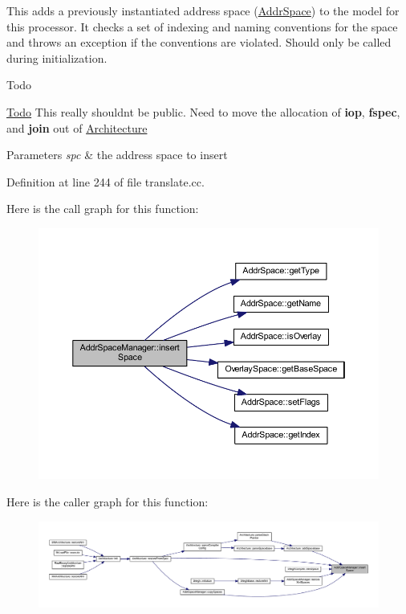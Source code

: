 This adds a previously instantiated address space (\mbox{\hyperlink{class_addr_space}{Addr\+Space}}) to the model for this processor. It checks a set of indexing and naming conventions for the space and throws an exception if the conventions are violated. Should only be called during initialization. \begin{DoxyRefDesc}{Todo}
\item[\mbox{\hyperlink{todo__todo000002}{Todo}}]This really shouldn\textquotesingle{}t be public. Need to move the allocation of {\bfseries{iop}}, {\bfseries{fspec}}, and {\bfseries{join}} out of \mbox{\hyperlink{class_architecture}{Architecture}} \end{DoxyRefDesc}

\begin{DoxyParams}{Parameters}
{\em spc} & the address space to insert \\
\hline
\end{DoxyParams}


Definition at line 244 of file translate.\+cc.

Here is the call graph for this function\+:
\nopagebreak
\begin{figure}[H]
\begin{center}
\leavevmode
\includegraphics[width=350pt]{class_addr_space_manager_a89658bd677414a271a918f0f37af0bd6_cgraph}
\end{center}
\end{figure}
Here is the caller graph for this function\+:
\nopagebreak
\begin{figure}[H]
\begin{center}
\leavevmode
\includegraphics[width=350pt]{class_addr_space_manager_a89658bd677414a271a918f0f37af0bd6_icgraph}
\end{center}
\end{figure}
\mbox{\label{class_addr_space_manager_ae2d22102a7ce6080918e82daafabbdfa}} 
